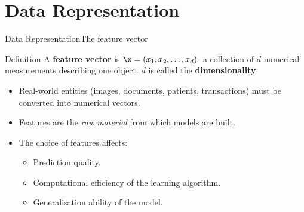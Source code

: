 \section{Data Representation}

\begin{frame}{Data Representation}{The feature vector}
  \begin{block}{Definition}
    A \textcolor{AccentBlue}{\textbf{feature vector}} is
    $\x = (x_1, x_2, \ldots, x_d)$: a collection of $d$ numerical measurements describing
    one object. $d$ is called the \textcolor{AccentBlue}{\textbf{dimensionality}}.
  \end{block}
  \bigskip
  \begin{itemize}
    \item Real-world entities (images, documents, patients, transactions) must be converted
          into numerical vectors.
    \item Features are the \emph{raw material} from which models are built.
    \item The choice of features affects:
      \begin{itemize}
        \item Prediction quality.
        \item Computational efficiency of the learning algorithm.
        \item Generalisation ability of the model.
      \end{itemize}
  \end{itemize}
\end{frame}

